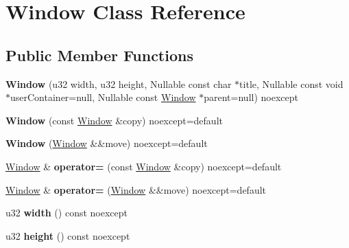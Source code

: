 \hypertarget{class_window}{}\section{Window Class Reference}
\label{class_window}
\subsection*{Public Member Functions}
\begin{DoxyCompactItemize}
\item 
\mbox{\label{class_window_abbfc29942c5764d56c383d06dede1d54}} 
{\bfseries Window} (u32 width, u32 height, Nullable const char $\ast$title, Nullable const void $\ast$user\+Container=null, Nullable const \mbox{\hyperlink{class_window}{Window}} $\ast$parent=null) noexcept
\item 
\mbox{\label{class_window_ab4bf82a7032223e2f4a0c9033706826b}} 
{\bfseries Window} (const \mbox{\hyperlink{class_window}{Window}} \&copy) noexcept=default
\item 
\mbox{\label{class_window_a613fe045b96f047ddbc1d991b4cde3a1}} 
{\bfseries Window} (\mbox{\hyperlink{class_window}{Window}} \&\&move) noexcept=default
\item 
\mbox{\label{class_window_adaebd07a572a8ba724c13fc1a2be65cb}} 
\mbox{\hyperlink{class_window}{Window}} \& {\bfseries operator=} (const \mbox{\hyperlink{class_window}{Window}} \&copy) noexcept=default
\item 
\mbox{\label{class_window_a454743cc24e4a428c9d28f4239876436}} 
\mbox{\hyperlink{class_window}{Window}} \& {\bfseries operator=} (\mbox{\hyperlink{class_window}{Window}} \&\&move) noexcept=default
\item 
\mbox{\label{class_window_afea4ec230d612e5fff3e8c72c227103d}} 
u32 {\bfseries width} () const noexcept
\item 
\mbox{\label{class_window_a1dbe3a32ba7758aa5469835f6a755680}} 
u32 {\bfseries height} () const noexcept
\item 
\mbox{\label{class_window_abeb6f33970a14509a124ffad71aecf39}} 

\end{DoxyCompactItemize}
